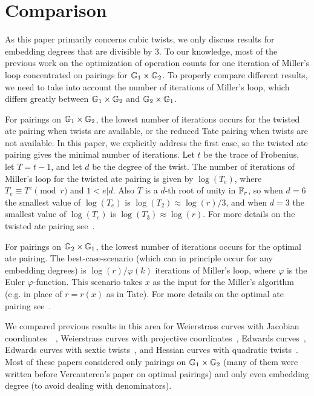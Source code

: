 \section{Comparison}
\label{sec:cmp}

As this paper primarily concerns cubic twists, 
we only discuss results for embedding degrees that are divisible by 3.
To our knowledge, most of the previous work
on the optimization of operation counts for one iteration of Miller's loop
concentrated on pairings for $\mathbb{G}_{1} \times \mathbb{G}_{2}$. 
To properly compare different results, we need to take
into account the number of iterations of Miller's loop, which differs
greatly between $\mathbb{G}_{1} \times \mathbb{G}_{2}$ and $\mathbb{G}_{2} \times \mathbb{G}_{1}$.

For pairings on $\mathbb{G}_{1} \times \mathbb{G}_{2}$, the lowest number of iterations occurs for the twisted ate pairing when twists are available, or the reduced Tate pairing when twists are not available.
In this paper, we explicitly address the first case, so the twisted ate pairing gives the minimal number of iterations. 
Let $t$ be the trace of Frobenius, let $T = t-1$, and let $d$ be the degree of the twist. The number of iterations of Miller's loop for the twisted ate pairing is given by $\log(T_e)$, where
$T_e \equiv T^e \pmod{r}$ and $1 < e | d$. 
Also $T$ is a $d$-th root of unity in $\mathbb{F}_{r}$, so when $d = 6$ the smallest value of
$\log(T_e)$ is $\log(T_2) \approx \log(r)/3$, and when $d = 3$ the smallest value of $\log(T_e)$ is
$\log(T_3) \approx \log(r)$. For more details on the twisted ate pairing see~\cite{2006/hess}.

For pairings on $\mathbb{G}_{2} \times \mathbb{G}_{1}$, the lowest number of iterations occurs for the optimal ate pairing. The best-case-scenario (which can in principle occur for any embedding degrees) is $\log(r)/\varphi(k)$ iterations of Miller's loop, where $\varphi$ is the Euler $\varphi$-function. This scenario takes $x$ as the input for the Miller's algorithm (e.g. in place of $r = r(x)$ as in Tate). For more details on the optimal ate pairing see~\cite{2010/vercauteren}. 

We compared previous results in this area for 
Weierstrass curves with Jacobian coordinates~\cite{2008/IonicaJoux08}~\cite{2009/fastertate},
Weierstrass curves with projective coordinates~\cite{2009/craig},
Edwards curves~\cite{2009/fastertate},
Edwards curves with sextic twists~\cite{2014/LWZ},
and Hessian curves with quadratic twists~\cite{2010/Gu}.
Most of these papers considered only pairings on $\mathbb{G}_{1} \times \mathbb{G}_{2}$ 
(many of them were written before Vercauteren's paper on optimal pairings)
and only even embedding degree (to avoid dealing with denominators).

